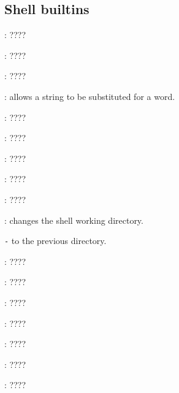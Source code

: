 \subsection{Shell builtins}
\begin{compactenum}
\item [\symbolbash] : \dotfill ????

\item [\symbolbash] \commandbash{:}: \dotfill ????

\item [\symbolbash] \commandbash{[}: \dotfill ????

\item [\symbolbash] : allows a string to be substituted for a word.

\item [\symbolbash] : \dotfill ????

\item [\symbolbash] : \dotfill ????

\item [\symbolbash] : \dotfill ????

\item [\symbolbash] : \dotfill ????

\item [\symbolbash] : \dotfill ????

\item [\symbolbash] : changes the shell working directory.
\item [\texttt{-}] to the previous directory.

\item [\symbolbash] : \dotfill ????

\item [\symbolbash] : \dotfill ????

\item [\symbolbash] : \dotfill ????

\item [\symbolbash] : \dotfill ????

\item [\symbolbash] : \dotfill ????

\item [\symbolbash] : \dotfill ????

\item [\symbolbash] : \dotfill ????


\end{compactenum}
